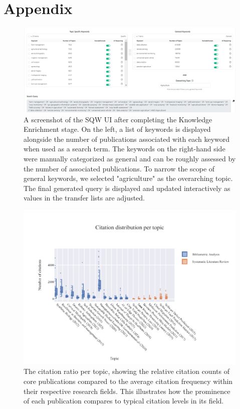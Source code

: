 \documentclass[%
  a4paper,fontsize=11pt,abstract=on,%
  oneside,BCOR=19mm,%
]{scrreprt}
\begin{document}
\chapter{Appendix}
\begin{figure}[!h]
	\vspace*{5cm}
	\centering
	\includegraphics[scale=0.35]{pics/sqw-stage1.png}
	\caption[SQW Knowledge Enrichment]{A screenshot of the SQW UI after completing the Knowledge Enrichment stage. On the left, a list of keywords is displayed alongside the number of publications associated with each keyword when used as a search term. The keywords on the right-hand side were manually categorized as general and can be roughly assessed by the number of associated publications. To narrow the scope of general keywords, we selected "agriculture" as the overarching topic. The final generated query is displayed and updated interactively as values in the transfer lists are adjusted.}

	\label{fig:sqw-stage1}
\end{figure}

\begin{figure}
	\centering	
	\includegraphics{pics/citation-distribution.pdf}
	\caption[Field Citation Ratio per Topic]{The citation ratio per topic, showing the relative citation counts of core publications compared to the average citation frequency within their respective research fields. This illustrates how the prominence of each publication compares to typical citation levels in its field.}
	\label{fig:dataset-citation}
\end{figure}
\end{document}
